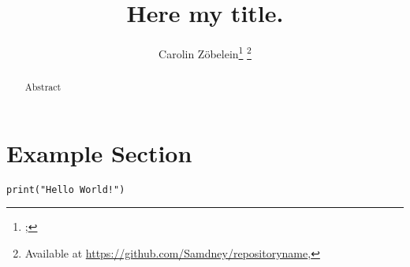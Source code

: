 

\title{Here my title.}

\author{Carolin Z\"obelein\footnote{; } \footnote{Available at \url{https://github.com/Samdney/repositoryname}, }}
\maketitle
\begin{abstract}
Abstract
\end{abstract}
\begin{flushleft}
	\par %
\end{flushleft}
\tableofcontents
\section{Example Section}
\label{s:exampleSection}
\begin{lstlisting}[firstnumber=3]
	print("Hello World!")
\end{lstlisting}
%
%
%

